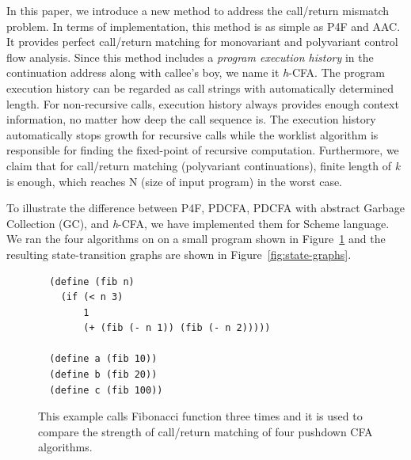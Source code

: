 \documentclass{article}
\begin{document}
In this paper, we introduce a new method to address the call/return mismatch problem.
In terms of implementation, this method is as simple as P4F and AAC.
It provides perfect call/return matching for monovariant and polyvariant control flow analysis.
Since this method includes a \emph{program execution history} in the continuation address along with callee's boy, we name it \textit{h}-CFA\@.
The program execution history can be regarded as call strings with automatically determined length.
For non-recursive calls, execution history always provides enough context information, no matter how deep the call sequence is.
The execution history automatically stops growth for recursive calls while the worklist algorithm is responsible
for finding the fixed-point of recursive computation.
Furthermore, we claim that for call/return matching (polyvariant continuations), finite length of \textit{k} is enough,
which reaches N (size of input program) in the worst case.

To illustrate the difference between P4F, PDCFA, PDCFA with abstract Garbage Collection (GC), and \textit{h}-CFA, we have
implemented them for Scheme language. We ran the four algorithms on on a small program shown in Figure~\ref{fig:fib} and
the resulting state-transition graphs are shown in Figure~\ref{fig:state-graphs}.

\begin{figure}
  \small
  \begin{lstlisting}
  (define (fib n)
    (if (< n 3)
        1
        (+ (fib (- n 1)) (fib (- n 2)))))

  (define a (fib 10))
  (define b (fib 20))
  (define c (fib 100))
  \end{lstlisting}
\caption{
This example calls Fibonacci function three times
and it is used to compare the strength of call/return matching of four pushdown CFA algorithms.
}
\label{fig:fib}
\end{figure}
\end{document}
